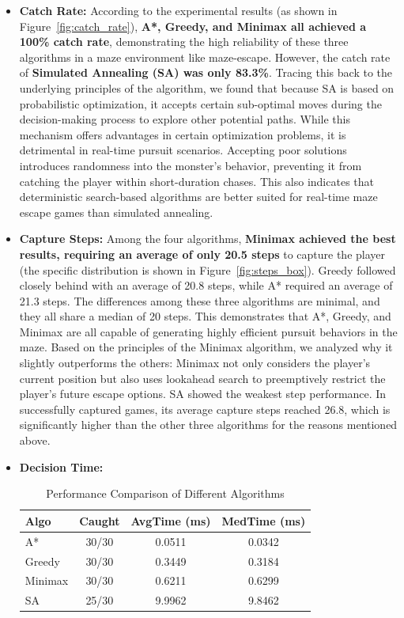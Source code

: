\documentclass[12pt,a4paper]{article}
\begin{document}
\begin{itemize}
    \item \textbf{Catch Rate:} According to the experimental results (as shown in Figure~\ref{fig:catch_rate}), \textbf{A*, Greedy, and Minimax all achieved a 100\% catch rate}, demonstrating the high reliability of these three algorithms in a maze environment like maze-escape. However, the catch rate of \textbf{Simulated Annealing (SA) was only 83.3\%}. Tracing this back to the underlying principles of the algorithm, we found that because SA is based on probabilistic optimization, it accepts certain sub-optimal moves during the decision-making process to explore other potential paths. While this mechanism offers advantages in certain optimization problems, it is detrimental in real-time pursuit scenarios. Accepting poor solutions introduces randomness into the monster's behavior, preventing it from catching the player within short-duration chases. This also indicates that deterministic search-based algorithms are better suited for real-time maze escape games than simulated annealing.
    
    \item \textbf{Capture Steps:} Among the four algorithms, \textbf{Minimax achieved the best results, requiring an average of only 20.5 steps} to capture the player (the specific distribution is shown in Figure~\ref{fig:steps_box}). Greedy followed closely behind with an average of 20.8 steps, while A* required an average of 21.3 steps. The differences among these three algorithms are minimal, and they all share a median of 20 steps. This demonstrates that A*, Greedy, and Minimax are all capable of generating highly efficient pursuit behaviors in the maze. Based on the principles of the Minimax algorithm, we analyzed why it slightly outperforms the others: Minimax not only considers the player's current position but also uses lookahead search to preemptively restrict the player's future escape options. SA showed the weakest step performance. In successfully captured games, its average capture steps reached 26.8, which is significantly higher than the other three algorithms for the reasons mentioned above.
    
    \item \textbf{Decision Time:} 
\begin{table}[htbp]
    \centering
    \small
    \caption{Performance Comparison of Different Algorithms}
    \label{tab:algo_performance}
    \begin{tabular}{lccc}
        \toprule
        Algo & Caught & AvgTime (ms) & MedTime (ms) \\
        \midrule
        A* & 30/30 & 0.0511 & 0.0342 \\
        Greedy  & 30/30 & 0.3449 & 0.3184 \\
        Minimax & 30/30 & 0.6211 & 0.6299 \\
        SA      & 25/30 & 9.9962 & 9.8462 \\
        \bottomrule
    \end{tabular}
\end{table}


\end{itemize}
\end{document}
